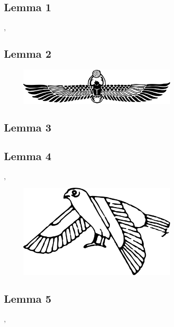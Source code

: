 \documentclass[preview]{standalone}
\begin{document}
\subsection[Lemma 1]{\color{section}Lemma 1}

\vspace{2\baselineskip}
\sep
\pagebreak


\subsection[Lemma 2]{\color{section}Lemma 2}

\begin{figure}[!h]
    \centering
    \includegraphics[width=8cm]{../resources/jpg/2.2.set.operations/scarab.png}
\end{figure}


\subsection[Lemma 3]{\color{section}Lemma 3}

\pagebreak


\subsection[Lemma 4]{\color{section}Lemma 4}

\sep
\vspace{1.5\baselineskip}
\begin{figure}[!h]
    \centering
    \includegraphics[width=8cm]{../resources/jpg/2.2.set.operations/bird.png}
\end{figure}
\pagebreak



\subsection[Lemma 5]{\color{section}Lemma 5}

\sep
\pagebreak
\end{document}
